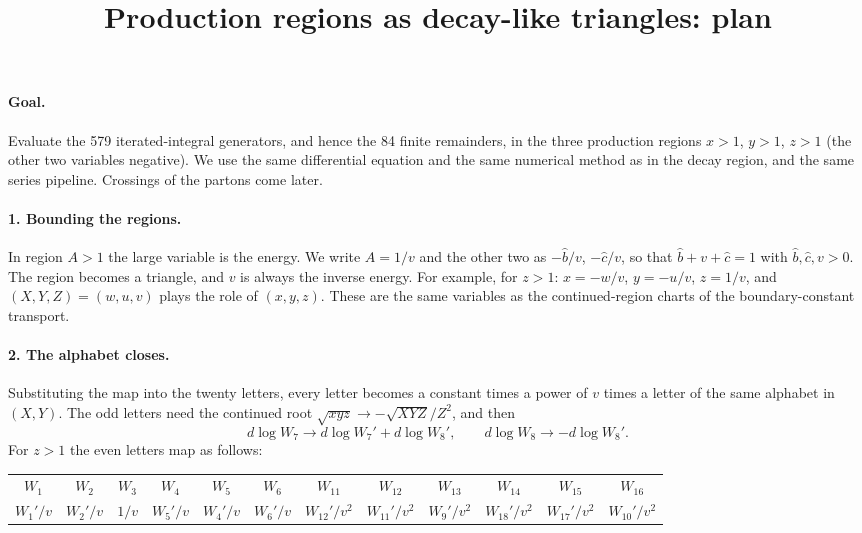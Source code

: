 \documentclass[11pt]{article}
\title{Production regions as decay-like triangles: plan}
\date{}
\begin{document}
\maketitle

\paragraph{Goal.} Evaluate the 579 iterated-integral generators, and hence the 84 finite remainders, in the three
production regions $x>1$, $y>1$, $z>1$ (the other two variables negative). We use the same differential equation and the
same numerical method as in the decay region, and the same series pipeline. Crossings of the partons come later.

\paragraph{1. Bounding the regions.} In region $A>1$ the large variable is the energy. We write $A=1/v$ and the
other two as $-\hat b/v$, $-\hat c/v$, so that $\hat b+v+\hat c=1$ with $\hat b,\hat c,v>0$. The region becomes a
triangle, and $v$ is always the inverse energy. For example, for $z>1$: $x=-w/v$, $y=-u/v$, $z=1/v$, and
$(X,Y,Z)=(w,u,v)$ plays the role of $(x,y,z)$. These are the same variables as the continued-region charts of the
boundary-constant transport.

\paragraph{2. The alphabet closes.} Substituting the map into the twenty letters, every letter becomes a constant
times a power of $v$ times a letter of the same alphabet in $(X,Y)$. The odd letters need the continued root
$\sqrt{xyz}\to-\sqrt{XYZ}/Z^2$, and then
\[ d\log W_7\to d\log W_7'+d\log W_8',\qquad d\log W_8\to -d\log W_8' . \]
For $z>1$ the even letters map as follows:

\begin{center}
\begin{tabular}{@{}cccccccccccc@{}}\toprule
$W_1$&$W_2$&$W_3$&$W_4$&$W_5$&$W_6$&$W_{11}$&$W_{12}$&$W_{13}$&$W_{14}$&$W_{15}$&$W_{16}$\\
$W_1'/v$&$W_2'/v$&$1/v$&$W_5'/v$&$W_4'/v$&$W_6'/v$&$W_{12}'/v^2$&$W_{11}'/v^2$&$W_9'/v^2$&$W_{18}'/v^2$&$W_{17}'/v^2$&$W_{10}'/v^2$\\\bottomrule
\end{tabular}
\end{center}
\end{document}
